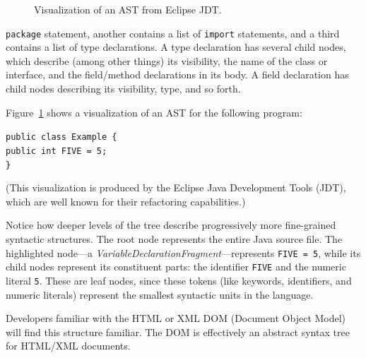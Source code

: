 \documentclass[prodmode]{acmlarge}
\newcommand{\ttt}[1]{\texttt{#1}}
\begin{document}
\begin{figure}
\caption{Visualization of an AST from Eclipse JDT.}
\label{fig:jdt-ast}
\end{figure}

\noindent
\ttt{package} statement, another
contains a list of \ttt{import} statements, and a third contains a list of type
declarations.  A type declaration has several child nodes, which describe
(among other things) its visibility, the name of the class or interface, and
the field/method declarations in its body.  A field declaration has child nodes
describing its visibility, type, and so forth.

Figure~\ref{fig:jdt-ast} shows a visualization of an AST for the following
program:
\vspace*{1em}

\noindent \ttt{public class Example \{ \\
\hspace*{.2em} public int FIVE = 5; \\
\}
}

\vspace*{1em}
\noindent (This visualization is produced by the Eclipse Java Development Tools
(JDT), which are well known for their refactoring capabilities.)

Notice how deeper levels of the tree describe progressively more fine-grained
syntactic structures.  The root node represents the entire Java source file.
The highlighted node---a \textit{VariableDeclarationFragment}---represents
\ttt{FIVE = 5}, while its child nodes represent its constituent parts: the
identifier \ttt{FIVE} and the numeric literal \ttt{5}.  These are leaf nodes,
since these tokens (like keywords, identifiers, and numeric literals) represent
the smallest syntactic units in the language.

Developers familiar with the HTML or XML DOM (Document Object Model) will find
this structure familiar.  The DOM is effectively an abstract syntax tree for
HTML/XML documents.
\end{document}
